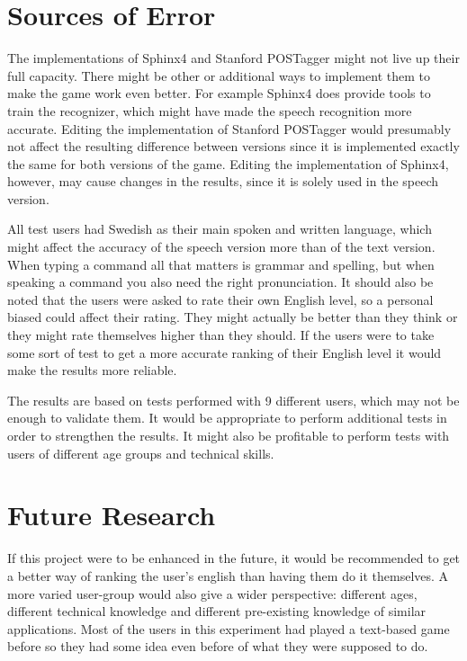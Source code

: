 \section{Sources of Error} %
The implementations of Sphinx4 and Stanford POSTagger might not live up their full capacity. There might be other or additional ways to implement them to make the game work even better. For example Sphinx4 does provide tools to train the recognizer, which might have made the speech recognition more accurate. Editing the implementation of Stanford POSTagger would presumably not affect the resulting difference between versions since it is implemented exactly the same for both versions of the game. Editing the implementation of Sphinx4, however, may cause changes in the results, since it is solely used in the speech version.

All test users had Swedish as their main spoken and written language, which might affect the accuracy of the speech version more than of the text version. When typing a command all that matters is grammar and spelling, but when speaking a command you also need the right pronunciation. It should also be noted that the users were asked to rate their own English level, so a personal biased could affect their rating. They might actually be better than they think or they might rate themselves higher than they should. If the users were to take some sort of test to get a more accurate ranking of their English level it would make the results more reliable.

The results are based on tests performed with 9 different users, which may not be enough to validate them. It would be appropriate to perform additional tests in order to strengthen the results. It might also be profitable to perform tests with users of different age groups and technical skills.

\section{Future Research}
If this project were to be enhanced in the future, it would be recommended to get a better way of ranking the user's english than having them do it themselves. A more varied user-group would also give a wider perspective: different ages, different technical knowledge and different pre-existing knowledge of similar applications. Most of the users in this experiment had played a text-based game before so they had some idea even before of what they were supposed to do.